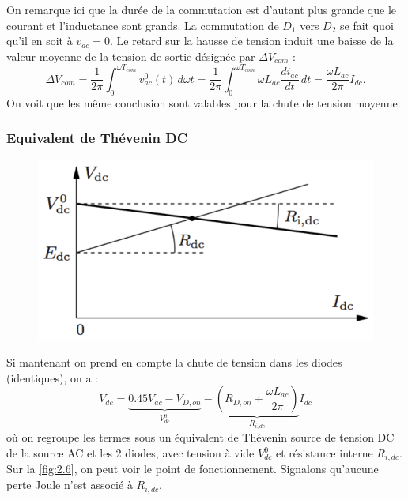 			On remarque ici que la durée de la commutation est d'autant plus grande que le courant et l'inductance sont grands. La commutation de $D_1$ vers $D_2$ se fait quoi qu'il en soit à $v_{dc} = 0$. Le retard sur la hausse de tension induit une baisse de la valeur moyenne de la tension de sortie désignée par $\Delta V_{com}$ : 			
			\begin{equation}
				\Delta V_{com} = \frac{1}{2\pi} \int _0 ^{\omega T_{com}} v_{ac}^0(t) \, d\omega t = \frac{1}{2\pi} \int _0 ^{\omega T_{com}} \omega L_{ac}\frac{di_{ac}}{dt} \, dt = \frac{\omega L_{ac}}{2\pi} I_{dc}.
 			\end{equation}
 			On voit que les même conclusion sont valables pour la chute de tension moyenne.  
 
 		\subsubsection{Equivalent de Thévenin DC}
 			
			\begin{figure}
			\vspace{-5mm}
			\includegraphics[scale=0.4]{ch2/7}
			\label{fig:2.6}
			\end{figure} 			
 			Si mantenant on prend en compte la chute de tension dans les diodes (identiques), on a : 
 			\begin{equation}
 				V_{dc} = \underbrace{0.45 V_{ac} - V_{D,on}}_{V_{dc}^0} - \underbrace{(R_{D,on}+\frac{\omega L_{ac}}{2\pi})}_{R_{i,dc}} I_{dc}
			\end{equation} 			 
			où on regroupe les termes sous un équivalent de Thévenin source de tension DC de la source AC et les 2 diodes, avec tension à vide $V_{dc}^0$ et résistance interne $R_{i,dc}$. Sur la \autoref{fig:2.6}, on peut voir le point de fonctionnement. Signalons qu'aucune perte Joule n'est associé à $R_{i,dc}$. 
			
